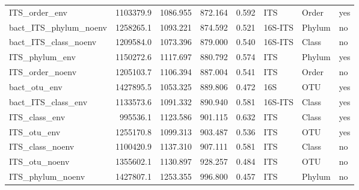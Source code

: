 \documentclass[
  letterpaper,
  DIV=11,
  numbers=noendperiod]{scrartcl}
\begin{document}
\begin{table}
\begin{tabular}[t]{lrrrrl>{\raggedright\arraybackslash}p{2cm}>{\raggedright\arraybackslash}p{2cm}}
ITS\_order\_env & 1103379.9 & 1086.955 & 872.164 & 0.592 & ITS & Order & yes\\
bact\_ITS\_phylum\_noenv & 1258265.1 & 1093.221 & 874.592 & 0.521 & 16S-ITS & Phylum & no\\
bact\_ITS\_class\_noenv & 1209584.0 & 1073.396 & 879.000 & 0.540 & 16S-ITS & Class & no\\
\addlinespace
ITS\_phylum\_env & 1150272.6 & 1117.697 & 880.792 & 0.574 & ITS & Phylum & yes\\
ITS\_order\_noenv & 1205103.7 & 1106.394 & 887.004 & 0.541 & ITS & Order & no\\
bact\_otu\_env & 1427895.5 & 1053.325 & 889.806 & 0.472 & 16S & OTU & yes\\
bact\_ITS\_class\_env & 1133573.6 & 1091.332 & 890.940 & 0.581 & 16S-ITS & Class & yes\\
ITS\_class\_env & 995536.1 & 1123.586 & 901.115 & 0.632 & ITS & Class & yes\\
\addlinespace
ITS\_otu\_env & 1255170.8 & 1099.313 & 903.487 & 0.536 & ITS & OTU & yes\\
ITS\_class\_noenv & 1100420.9 & 1137.310 & 907.111 & 0.581 & ITS & Class & no\\
ITS\_otu\_noenv & 1355602.1 & 1130.897 & 928.257 & 0.484 & ITS & OTU & no\\
ITS\_phylum\_noenv & 1427807.1 & 1253.355 & 996.800 & 0.457 & ITS & Phylum & no\\
\bottomrule
\end{tabular}
\end{table}
\end{document}
